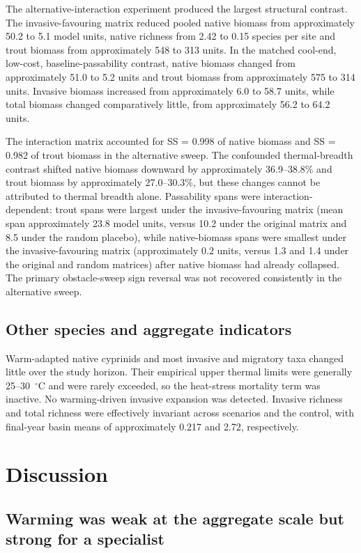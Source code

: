\documentclass[11pt,a4paper]{article}
\begin{document}
The alternative-interaction experiment produced the largest structural contrast. The invasive-favouring matrix reduced pooled native biomass from approximately 50.2 to 5.1 model units, native richness from 2.42 to 0.15 species per site and trout biomass from approximately 548 to 313 units. In the matched cool-end, low-cost, baseline-passability contrast, native biomass changed from approximately 51.0 to 5.2 units and trout biomass from approximately 575 to 314 units. Invasive biomass increased from approximately 6.0 to 58.7 units, while total biomass changed comparatively little, from approximately 56.2 to 64.2 units.

The interaction matrix accounted for SS = 0.998 of native biomass and SS = 0.982 of trout biomass in the alternative sweep. The confounded thermal-breadth contrast shifted native biomass downward by approximately 36.9--38.8\% and trout biomass by approximately 27.0--30.3\%, but these changes cannot be attributed to thermal breadth alone. Passability spans were interaction-dependent: trout spans were largest under the invasive-favouring matrix (mean span approximately 23.8 model units, versus 10.2 under the original matrix and 8.5 under the random placebo), while native-biomass spans were smallest under the invasive-favouring matrix (approximately 0.2 units, versus 1.3 and 1.4 under the original and random matrices) after native biomass had already collapsed. The primary obstacle-sweep sign reversal was not recovered consistently in the alternative sweep.

\subsection{Other species and aggregate indicators}

Warm-adapted native cyprinids and most invasive and migratory taxa changed little over the study horizon. Their empirical upper thermal limits were generally 25--30~$^\circ$C and were rarely exceeded, so the heat-stress mortality term was inactive. No warming-driven invasive expansion was detected. Invasive richness and total richness were effectively invariant across scenarios and the control, with final-year basin means of approximately 0.217 and 2.72, respectively.

\section{Discussion}

\subsection{Warming was weak at the aggregate scale but strong for a specialist}
\end{document}
